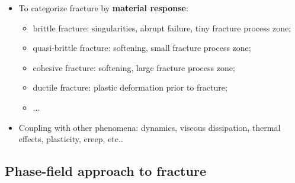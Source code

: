 \begin{frame}
\begin{itemize}
    \item<12-> To categorize fracture by \textbf{material response}:
    \begin{itemize}
      \item<13-> brittle fracture: singularities, abrupt failure, tiny fracture process zone;
      \item<14-> quasi-brittle fracture: softening, small fracture process zone;
      \item<15-> cohesive fracture: softening, large fracture process zone;
      \item<16-> ductile fracture: plastic deformation prior to fracture;
      \item<16-> ...
    \end{itemize}
    
    \item<17-> Coupling with other phenomena: dynamics, viscous dissipation, thermal effects, plasticity, creep, etc..
  \end{itemize}
  
\end{frame}

\subsection{Phase-field approach to fracture}

